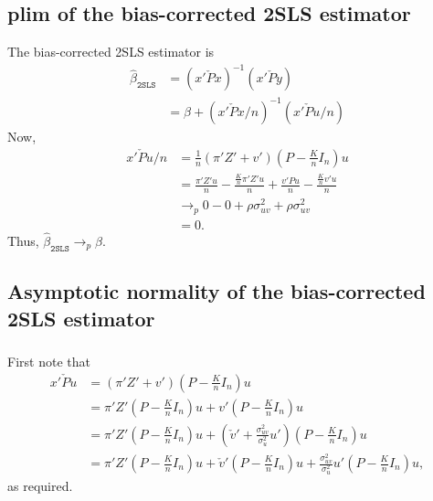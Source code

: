 \documentclass[12pt]{article}
\newcommand{\mtx}[1]{\ensuremath{\bm{\mathit{#1}}}}
\begin{document}
\subsection{plim of the bias-corrected 2SLS estimator}
The bias-corrected 2SLS estimator is
\begin{align*}
\hat\beta_{\texttt{2SLS}} &= (\mtx{x}'\check{\mtx{P}}\mtx{x})^{-1}(\mtx{x}'\check{\mtx{P}}\mtx{y})\\
&=\beta + (\mtx{x}'\check{\mtx{P}}\mtx{x}/n)^{-1}(\mtx{x}'\check{\mtx{P}}\mtx{u}/n)
\end{align*}
Now,
\begin{align*}
\mtx{x}'\check{\mtx{P}}\mtx{u}/n &=\frac{1}{n}(\mtx{\pi}'\mtx{Z}'+\mtx{v}')(\mtx{P} - \frac{K}{n}\mtx{I}_n)\mtx{u}\\
&=\frac{\mtx{\pi}'\mtx{Z}'\mtx{u}}{n} -\frac{\frac{K}{n}\mtx{\pi}'\mtx{Z}'\mtx{u}}{n} + \frac{\mtx{v}'\mtx{P}\mtx{u}}{n} - \frac{\frac{K}{n}\mtx{v}'\mtx{u}}{n}\\
&\to_p 0 - 0 + \rho \sigma_{uv}^2 + \rho \sigma^2_{uv}\\
&=0.
\end{align*}
Thus, $\hat\beta_{\texttt{2SLS}} \to_p \beta$.

\subsection{Asymptotic normality of the bias-corrected 2SLS estimator}

\subsubsection{}
First note that
\begin{align*}
\mtx{x}'\check{\mtx{P}}\mtx{u} &=(\mtx{\pi}'\mtx{Z}'+\mtx{v}')(\mtx{P} - \frac{K}{n}\mtx{I}_n)\mtx{u}\\
&=\mtx{\pi}'\mtx{Z}'(\mtx{P} - \frac{K}{n}\mtx{I}_n)\mtx{u} + \mtx{v}'(\mtx{P} - \frac{K}{n}\mtx{I}_n)\mtx{u}\\
&=\mtx{\pi}'\mtx{Z}'(\mtx{P} - \frac{K}{n}\mtx{I}_n)\mtx{u} + \left(\check{\mtx{v}}' + \frac{\sigma^2_{uv}}{\sigma^2_u}\mtx{u}'\right)(\mtx{P} - \frac{K}{n}\mtx{I}_n)\mtx{u}\\
&=\mtx{\pi}'\mtx{Z}'(\mtx{P} - \frac{K}{n}\mtx{I}_n)\mtx{u} + \check{\mtx{v}}'(\mtx{P} - \frac{K}{n}\mtx{I}_n)\mtx{u} + \frac{\sigma^2_{uv}}{\sigma^2_u}\mtx{u}'(\mtx{P} - \frac{K}{n}\mtx{I}_n)\mtx{u},
\end{align*}
as required.
\end{document}
